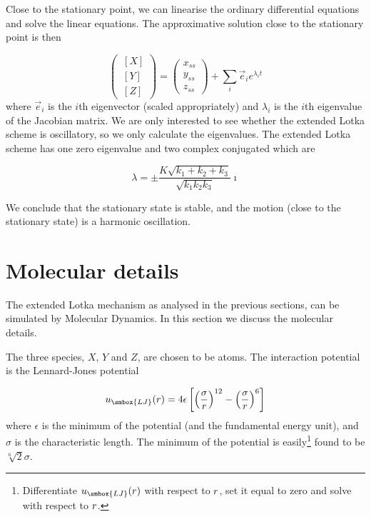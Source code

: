 Close to the stationary point, we can linearise the ordinary
differential equations and solve the linear equations. The
approximative solution close to the stationary point is then 

\begin{equation}
  \left(\begin{array}{c}\, [X]\\ \, [Y]\\ \, [Z]\end{array}\right)
  =   \left(\begin{array}{c} x_{ss}\\ y_{ss}\\ z_{ss}\end{array}\right)
   + \sum_i \vec{e}_i e^{\lambda_i t}
\end{equation}
where $\vec{e}_i$ is the $i$th eigenvector (scaled appropriately) and
$\lambda_i$ is the $i$th eigenvalue of the Jacobian matrix. We are
only interested to see whether the extended Lotka scheme is
oscillatory, so we only calculate the eigenvalues. The extended Lotka
scheme has one zero eigenvalue and two complex conjugated which are

\begin{equation}
  \lambda = \pm \frac{K\sqrt{k_1+k_2+k_3}}{\sqrt{k_1k_2k_3}} \imath
\end{equation}

We conclude that the stationary state is stable, and the
motion (close to the stationary state) is a harmonic oscillation.

\section{Molecular details}
\label{sect:MolecDetail}
The extended Lotka mechanism as analysed in the previous sections, can
be simulated by Molecular Dynamics. In this section we discuss the
molecular details. 

The three species, $X$, $Y$ and $Z$, are chosen to be atoms. The
interaction potential is the Lennard-Jones potential \ie

\begin{equation}
\label{eq:LJpot}
  u_{\smbox{LJ}}(r) = 4\epsilon \left[\left(\frac{\sigma}{r}\right)^{12} -
    \left(\frac{\sigma}{r}\right)^6 \right]
\end{equation}
where $\epsilon$ is the minimum of the potential (and the fundamental
energy unit), and $\sigma$ is the characteristic length. The minimum
of the potential is easily\footnote{Differentiate
  \protect$u_{\smbox{LJ}}(r)\protect$ with respect to
  \protect$r\protect$, set it equal to zero and solve with respect to
  \protect$r\protect$.} found to be $\sqrt[6]{2}\sigma$. 

